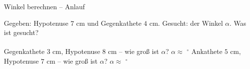\setcounter{aufgabe}{0}

\begin{aufgabe}{Winkel berechnen – Anlauf}
\begin{teile}
\teil Gegeben: Hypotenuse $7$ cm und Gegenkathete $4$ cm. Gesucht: der Winkel $\alpha$. Was ist gesucht? \\  \\ 
\teil Gegenkathete $3$ cm, Hypotenuse $8$ cm – wie groß ist $\alpha$? $\alpha \approx$ \leerfeld $^\circ$
\teil Ankathete $5$ cm, Hypotenuse $7$ cm – wie groß ist $\alpha$? $\alpha \approx$ \leerfeld $^\circ$
\end{teile}
\end{aufgabe}

